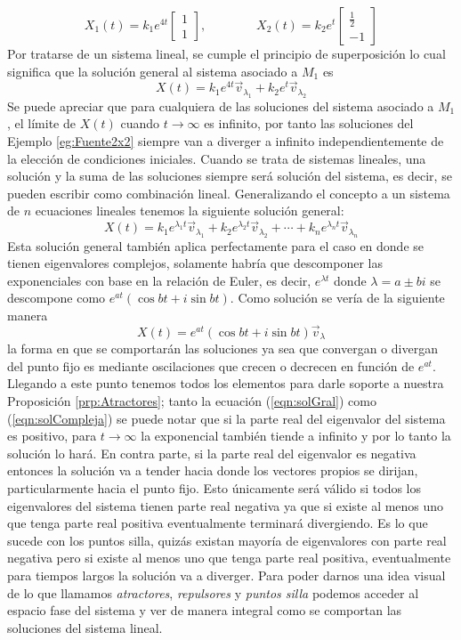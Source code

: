 $$X_1(t)=k_1e^{4t}\begin{bmatrix}
	1\\
	1
\end{bmatrix},\qquad\qquad X_2(t)=k_2e^{t}\begin{bmatrix}
\frac{1}{2}\\
-1
\end{bmatrix}$$
Por tratarse de un sistema lineal, se cumple el principio de superposición lo cual significa que la solución general al sistema asociado a $M_1$ es
$$X(t)=k_1e^{4t}\vec{v}_{\lambda_1}+k_2e^{t}\vec{v}_{\lambda_2}$$
Se puede apreciar que para cualquiera de las soluciones del sistema asociado a $M_1$, el límite de $X(t)$ cuando $t\to\infty$ es infinito, por tanto las soluciones del Ejemplo \ref{eg:Fuente2x2} siempre van a diverger a infinito independientemente de la elección de condiciones iniciales. Cuando se trata de sistemas lineales, una solución y la suma de las soluciones siempre será solución del sistema, es decir, se pueden escribir como combinación lineal. Generalizando el concepto a un sistema de $n$ ecuaciones lineales tenemos la siguiente solución general:
\begin{equation}\label{eqn:solGral}
	X(t)=k_1e^{\lambda_1 t}\vec{v}_{\lambda_1}+k_2e^{\lambda_2 t}\vec{v}_{\lambda_2}+\cdots+k_ne^{\lambda_n t}\vec{v}_{\lambda_n}
\end{equation}
Esta solución general también aplica perfectamente para el caso en donde se tienen eigenvalores complejos, solamente habría que descomponer las exponenciales con base en la relación de Euler, es decir, $e^{\lambda t}$ donde $\lambda=a\pm bi$ se descompone como $e^{at}\left (\cos bt+i\sin bt\right )$. Como solución se vería de la siguiente manera
\begin{equation}\label{eqn:solCompleja}
	X(t)=e^{at}\left (\cos bt+i\sin bt\right )\vec{v}_{\lambda}
\end{equation}
la forma en que se comportarán las soluciones ya sea que convergan o divergan del punto fijo es mediante oscilaciones que crecen o decrecen en función de $e^{at}$. Llegando a este punto tenemos todos los elementos para darle soporte a nuestra Proposición \ref{prp:Atractores}; tanto la ecuación (\ref{eqn:solGral}) como (\ref{eqn:solCompleja}) se puede notar que si la parte real del eigenvalor del sistema es positivo, para $t\to\infty$ la exponencial también tiende a infinito y por lo tanto la solución lo hará. En contra parte, si la parte real del eigenvalor es negativa entonces la solución va a tender hacia donde los vectores propios se dirijan, particularmente hacia el punto fijo. Esto únicamente será válido si todos los eigenvalores del sistema tienen parte real negativa ya que si existe al menos uno que tenga parte real positiva eventualmente terminará divergiendo. Es lo que sucede con los puntos silla, quizás existan mayoría de eigenvalores con parte real negativa pero si existe al menos uno que tenga parte real positiva, eventualmente para tiempos largos la solución va a diverger. Para poder darnos una idea visual de lo que llamamos \textit{atractores}, \textit{repulsores} y \textit{puntos silla} podemos acceder al espacio fase del sistema y ver de manera integral como se comportan las soluciones del sistema lineal.
